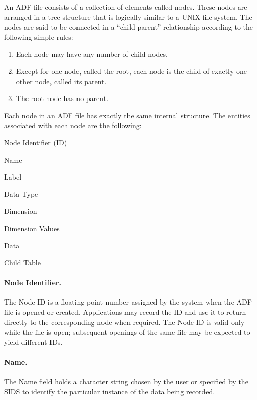 An ADF file consists of a collection of elements called nodes.
These nodes are arranged in a tree structure that is logically similar
to a UNIX file system.
The nodes are said to be connected in a ``child-parent'' relationship
according to the following simple rules:

\begin{enumerate}
\item Each node may have any number of child nodes.
\item Except for one node, called the root, each node is the child of
      exactly one other node, called its parent.
\item The root node has no parent.
\end{enumerate}

Each node in an ADF file has exactly the same internal structure.
The entities associated with each node are the following:

\begin{itemize*}
\item Node Identifier (ID)
\item Name
\item Label
\item Data Type
\item Dimension
\item Dimension Values
\item Data
\item Child Table
\end{itemize*}

\paragraph{Node Identifier.}
The Node ID is a floating point number assigned by the system when the
ADF file is opened or created.
Applications may record the ID and use it to return directly to the
corresponding node when required.
The Node ID is valid only while the file is open; subsequent openings of
the same file may be expected to yield different IDs.

\paragraph{Name.}
The Name field holds a character string chosen by the user or specified
by the SIDS to identify the particular instance of the data being
recorded.


